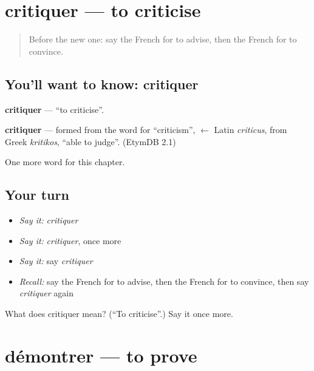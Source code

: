 \section[critiquer]{critiquer — to criticise}

\label{lesson:FR-C147-critiquer}



\begin{quote}
Before the new one: say the French for to advise, then the French for to convince.
\end{quote}

\subsection*{You'll want to know: critiquer}
\textbf{critiquer} — \textquotedblleft{}to criticise\textquotedblright{}.

\begin{cousinweb}
\textbf{critiquer} — formed from the word for \textquotedblleft{}criticism\textquotedblright{}, $\leftarrow$ Latin \emph{criticus}, from Greek \emph{kritikos}, \textquotedblleft{}able to judge\textquotedblright{}. (EtymDB 2.1)
\end{cousinweb}

\begin{grammarlens}[title={What you've built}]
One more word for this chapter.
\end{grammarlens}

\subsection*{Your turn}
\begin{itemize}
\raggedright
  \item \emph{Say it:} \emph{critiquer}
  \item \emph{Say it:} \emph{critiquer}, once more
  \item \emph{Say it:} say \emph{critiquer}
  \item \emph{Recall:} say the French for to advise, then the French for to convince, then say \emph{critiquer} again
\end{itemize}

\begin{tcolorbox}[breakable,colback=teal!4,colframe=teal!35!black,title={Before you move on}]
What does critiquer mean? (\textquotedblleft{}To criticise\textquotedblright{}.) Say it once more.
\end{tcolorbox}
\section[démontrer]{démontrer — to prove}

